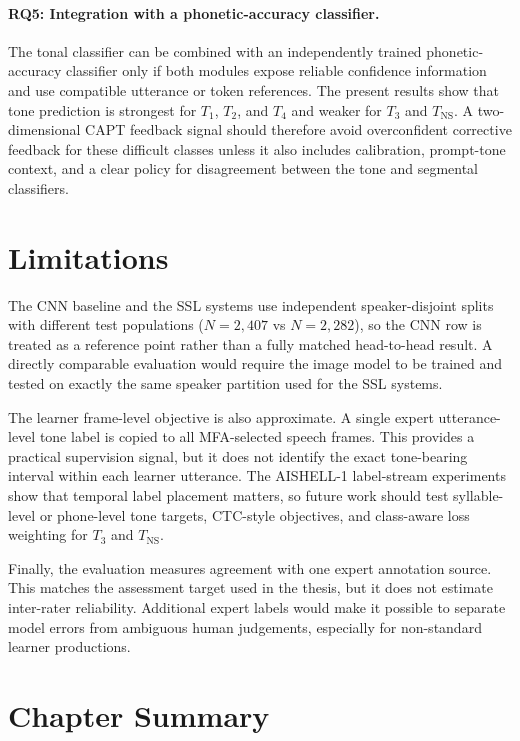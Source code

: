 \paragraph{RQ5: Integration with a phonetic-accuracy classifier.}
The tonal classifier can be combined with an independently trained
phonetic-accuracy classifier only if both modules expose reliable confidence
information and use compatible utterance or token references. The present
results show that tone prediction is strongest for \(T_1\), \(T_2\), and \(T_4\)
and weaker for \(T_3\) and \(T_{\mathrm{NS}}\). A two-dimensional CAPT feedback signal
should therefore avoid overconfident corrective feedback for these difficult
classes unless it also includes calibration, prompt-tone context, and a clear
policy for disagreement between the tone and segmental classifiers.

\section{Limitations}
\label{sec:exp:limitations}

The CNN baseline and the SSL systems use independent speaker-disjoint splits
with different test populations ($N=2{,}407$ vs $N=2{,}282$), so the CNN row
is treated as a reference point rather than a fully matched head-to-head
result. A directly comparable evaluation would require the image model to be
trained and tested on exactly the same speaker partition used for the SSL
systems.

The learner frame-level objective is also approximate. A single expert
utterance-level tone label is copied to all MFA-selected speech frames. This
provides a practical supervision signal, but it does not identify the exact
tone-bearing interval within each learner utterance. The AISHELL-1 label-stream
experiments show that temporal label placement matters, so future work should
test syllable-level or phone-level tone targets, CTC-style objectives, and
class-aware loss weighting for \(T_3\) and \(T_{\mathrm{NS}}\).

Finally, the evaluation measures agreement with one expert annotation source.
This matches the assessment target used in the thesis, but it does not estimate
inter-rater reliability. Additional expert labels would make it possible to
separate model errors from ambiguous human judgements, especially for
non-standard learner productions.

\section{Chapter Summary}
\label{sec:exp:summary}

